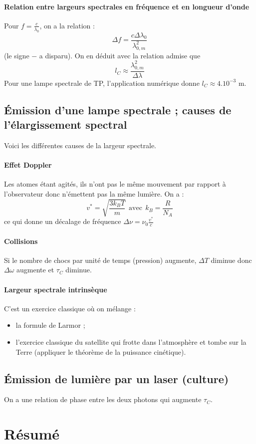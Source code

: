 \documentclass[french]{book}
\theoremstyle{plain}
\theoremstyle{definition}
\theoremstyle{remark}
\newcommand{\st}{^*}
\begin{document}
\paragraph{Relation entre largeurs spectrales en fréquence et en longueur d'onde} Pour $f=\displaystyle\frac{c}{\lambda_0}$, on a la relation : $$\Delta f=\frac{c\Delta\lambda_0}{\lambda_{0,m}^2}$$ (le signe $-$ a disparu). On en déduit avec la relation admise que $$l_C\approx\frac{\lambda_{0,m}^2}{\Delta\lambda}$$ Pour une lampe spectrale de TP, l'application numérique donne $l_C\approx 4.10^{-3}$ m.
\subsection{Émission d'une lampe spectrale ; causes de l'élargissement spectral}
Voici les différentes causes de la largeur spectrale.
\paragraph{Effet Doppler} Les atomes étant agités, ils n'ont pas le même mouvement par rapport à l'observateur donc n'émettent pas la même lumière. On a : $$v\st=\sqrt{\frac{3k_BT}{m}} \ \ \text{avec} \ \ k_B=\frac{R}{N_A}$$ ce qui donne un décalage de fréquence $\Delta\nu=\displaystyle\nu_0\frac{v\st}{c}$
\paragraph{Collisions} Si le nombre de chocs par unité de temps (pression) augmente, $\Delta T$ diminue donc $\Delta\omega$ augmente et $\tau_C$ diminue.
\paragraph{Largeur spectrale intrinsèque} C'est un exercice classique où on mélange :
\begin{itemize}
	\item la formule de Larmor ;
	\item l'exercice classique du satellite qui frotte dans l'atmosphère et tombe sur la Terre (appliquer le théorème de la puissance cinétique).
\end{itemize}
\subsection{Émission de lumière par un laser (culture)}
On a une relation de phase entre les deux photons qui augmente $\tau_C$.
\section{Résumé}
\end{document}
